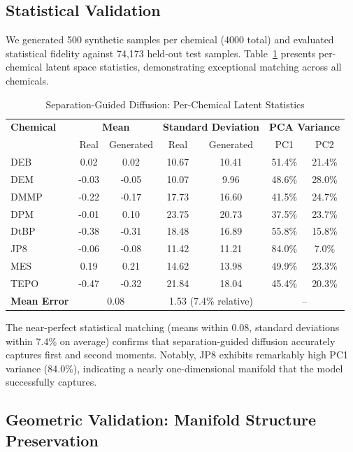\documentclass[sigconf]{acmart}
\begin{document}
\subsection{Statistical Validation}

We generated 500 synthetic samples per chemical (4000 total) and evaluated statistical fidelity against 74,173 held-out test samples. Table~\ref{tab:ims-statistics} presents per-chemical latent space statistics, demonstrating exceptional matching across all chemicals.

\begin{table}[h]
\caption{Separation-Guided Diffusion: Per-Chemical Latent Statistics}
\label{tab:ims-statistics}
\begin{tabular}{l|cc|cc|cc}
\toprule
\textbf{Chemical} & \multicolumn{2}{c|}{\textbf{Mean}} & \multicolumn{2}{c|}{\textbf{Standard Deviation}} & \multicolumn{2}{c}{\textbf{PCA Variance}} \\
& Real & Generated & Real & Generated & PC1 & PC2 \\
\midrule
DEB & 0.02 & 0.02 & 10.67 & 10.41 & 51.4\% & 21.4\% \\
DEM & -0.03 & -0.05 & 10.07 & 9.96 & 48.6\% & 28.0\% \\
DMMP & -0.22 & -0.17 & 17.73 & 16.60 & 41.5\% & 24.7\% \\
DPM & -0.01 & 0.10 & 23.75 & 20.73 & 37.5\% & 23.7\% \\
DtBP & -0.38 & -0.31 & 18.48 & 16.89 & 55.8\% & 15.8\% \\
JP8 & -0.06 & -0.08 & 11.42 & 11.21 & 84.0\% & 7.0\% \\
MES & 0.19 & 0.21 & 14.62 & 13.98 & 49.9\% & 23.3\% \\
TEPO & -0.47 & -0.32 & 21.84 & 18.04 & 45.4\% & 20.3\% \\
\midrule
\textbf{Mean Error} & \multicolumn{2}{c|}{0.08} & \multicolumn{2}{c|}{1.53 (7.4\% relative)} & \multicolumn{2}{c}{--} \\
\bottomrule
\end{tabular}
\end{table}

The near-perfect statistical matching (means within 0.08, standard deviations within 7.4\% on average) confirms that separation-guided diffusion accurately captures first and second moments. Notably, JP8 exhibits remarkably high PC1 variance (84.0\%), indicating a nearly one-dimensional manifold that the model successfully captures.

\subsection{Geometric Validation: Manifold Structure Preservation}
\end{document}
